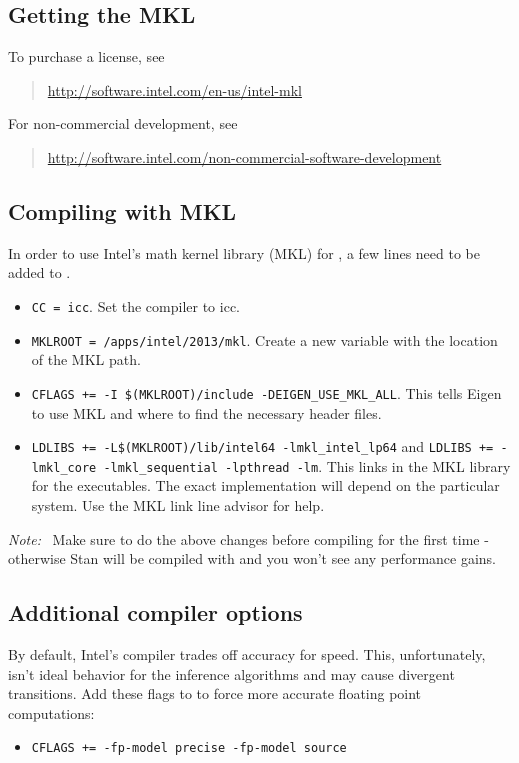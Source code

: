 \subsection{Getting the MKL}

To purchase a license, see
%
\begin{quote}
\url{http://software.intel.com/en-us/intel-mkl}
\end{quote}
%
For non-commercial development, see
%
\begin{quote}\small
\url{http://software.intel.com/non-commercial-software-development}
\end{quote}

\subsection{Compiling with MKL}

In order to use Intel's math kernel library (MKL) for \Cpp, a few
lines need to be added to . 
\begin{itemize}
  \item \Verb|CC = icc|. Set the compiler to icc.
  \item \Verb|MKLROOT = /apps/intel/2013/mkl|. Create a new variable
    with the location of the MKL path.
  \item
    \Verb|CFLAGS += -I $(MKLROOT)/include -DEIGEN_USE_MKL_ALL|. This
    tells Eigen to use MKL and where to find the necessary header
    files.
  \item \Verb|LDLIBS += -L$(MKLROOT)/lib/intel64 -lmkl_intel_lp64| and
    \Verb|LDLIBS += -lmkl_core -lmkl_sequential -lpthread -lm|. This
    links in the MKL library for the \CmdStan executables. The exact
    implementation will depend on the particular system. Use the MKL
    link line advisor for help.
\end{itemize}
%
{\it Note:} \ Make sure to do the above changes before compiling for the first
time - otherwise Stan will be compiled with  and you won't see any
performance gains.

\subsection{Additional compiler options}

By default, Intel's compiler trades off accuracy for speed. This,
unfortunately, isn't ideal behavior for the inference algorithms
and may cause divergent transitions. Add these flags to 
to force more accurate floating point computations:
\begin{itemize}
  \item \Verb|CFLAGS += -fp-model precise -fp-model source|
\end{itemize}


